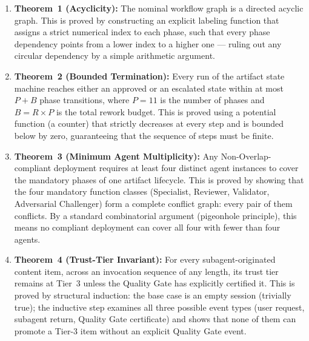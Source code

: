 \documentclass[12pt]{article}
\begin{document}
\begin{enumerate}
    \item \textbf{Theorem~1 (Acyclicity):} The nominal workflow graph
          is a directed acyclic graph.
          This is proved by constructing an explicit labeling function
          that assigns a strict numerical index to each phase, such
          that every phase dependency points from a lower index to a
          higher one --- ruling out any circular dependency by a
          simple arithmetic argument.

    \item \textbf{Theorem~2 (Bounded Termination):} Every run of the
          artifact state machine reaches either an approved or an
          escalated state within at most $P + B$ phase transitions,
          where $P = 11$ is the number of phases and $B = R \times P$
          is the total rework budget.
          This is proved using a potential function (a counter) that
          strictly decreases at every step and is bounded below by
          zero, guaranteeing that the sequence of steps must be finite.

    \item \textbf{Theorem~3 (Minimum Agent Multiplicity):} Any
          Non-Overlap-compliant deployment requires at least four
          distinct agent instances to cover the mandatory phases of
          one artifact lifecycle.
          This is proved by showing that the four mandatory function
          classes (Specialist, Reviewer, Validator, Adversarial
          Challenger) form a complete conflict graph: every pair of
          them conflicts.
          By a standard combinatorial argument (pigeonhole principle),
          this means no compliant deployment can cover all four with
          fewer than four agents.

    \item \textbf{Theorem~4 (Trust-Tier Invariant):} For every
          subagent-originated content item, across an invocation
          sequence of any length, its trust tier remains at Tier~3
          unless the Quality Gate has explicitly certified it.
          This is proved by structural induction: the base case
          is an empty session (trivially true); the inductive step
          examines all three possible event types (user request,
          subagent return, Quality Gate certificate) and shows that
          none of them can promote a Tier-3 item without an explicit
          Quality Gate event.
\end{enumerate}
\end{document}
